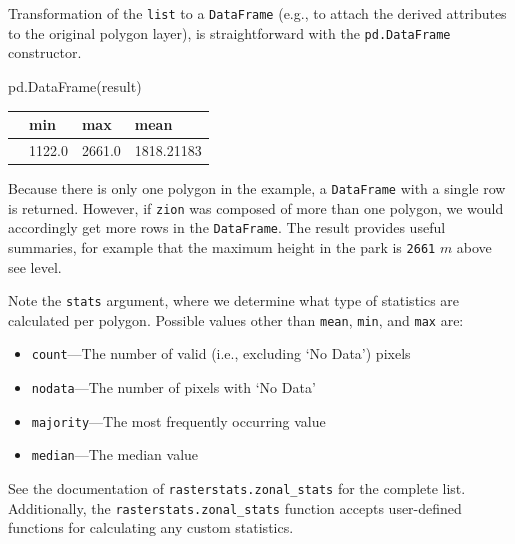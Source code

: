 \documentclass[
  letterpaper,
]{krantz}
\newenvironment{Shaded}{\begin{snugshade}}{\end{snugshade}}
\newcommand{\NormalTok}[1]{\textcolor[rgb]{0.00,0.23,0.31}{#1}}
\providecommand{\tightlist}{%
  \setlength{\itemsep}{0pt}\setlength{\parskip}{0pt}}\usepackage{longtable,booktabs,array}
\begin{document}
Transformation of the \texttt{list} to a \texttt{DataFrame} (e.g., to
attach the derived attributes to the original polygon layer), is
straightforward with the \texttt{pd.DataFrame} constructor.

\begin{Shaded}
\begin{Highlighting}[]
\NormalTok{pd.DataFrame(result)}
\end{Highlighting}
\end{Shaded}

\begin{longtable}[]{@{}llll@{}}
\toprule\noalign{}
& min & max & mean \\
\midrule\noalign{}
\endhead
\bottomrule\noalign{}
\endlastfoot
0 & 1122.0 & 2661.0 & 1818.21183 \\
\end{longtable}

Because there is only one polygon in the example, a \texttt{DataFrame}
with a single row is returned. However, if \texttt{zion} was composed of
more than one polygon, we would accordingly get more rows in the
\texttt{DataFrame}. The result provides useful summaries, for example
that the maximum height in the park is \texttt{2661} \(m\) above see
level.

Note the \texttt{stats} argument, where we determine what type of
statistics are calculated per polygon. Possible values other than
\texttt{\textquotesingle{}mean\textquotesingle{}},
\texttt{\textquotesingle{}min\textquotesingle{}}, and
\texttt{\textquotesingle{}max\textquotesingle{}} are:

\begin{itemize}
\tightlist
\item
  \texttt{\textquotesingle{}count\textquotesingle{}}---The number of
  valid (i.e., excluding `No Data') pixels
\item
  \texttt{\textquotesingle{}nodata\textquotesingle{}}---The number of
  pixels with `No Data'
\item
  \texttt{\textquotesingle{}majority\textquotesingle{}}---The most
  frequently occurring value
\item
  \texttt{\textquotesingle{}median\textquotesingle{}}---The median value
\end{itemize}

See the documentation of \texttt{rasterstats.zonal\_stats} for the
complete list. Additionally, the \texttt{rasterstats.zonal\_stats}
function accepts user-defined functions for calculating any custom
statistics.
\end{document}
